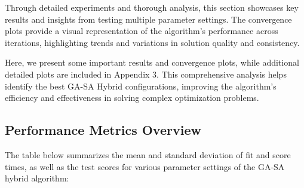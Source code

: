 \documentclass[
]{article}
\begin{document}
    Through detailed experiments and thorough analysis, this section showcases key results and insights from testing multiple parameter settings. The convergence plots provide a visual representation of the algorithm's performance across iterations, highlighting trends and variations in solution quality and consistency.

    Here, we present some important results and convergence plots, while additional detailed plots are included in Appendix 3. This comprehensive analysis helps identify the best GA-SA Hybrid configurations, improving the algorithm's efficiency and effectiveness in solving complex optimization problems.



    \subsection{Performance Metrics Overview}

    The table below summarizes the mean and standard deviation of fit and score times, as well as the test scores for various parameter settings of the GA-SA hybrid algorithm:
\end{document}

